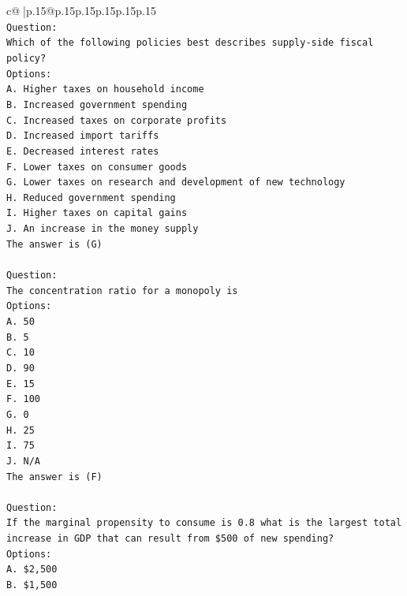 \documentclass{article}
\begin{document}
{\begin{supertabular}{c@{$\;$}|p{.15\linewidth}@{}p{.15\linewidth}p{.15\linewidth}p{.15\linewidth}p{.15\linewidth}p{.15\linewidth}}
{{{\\ 
\texttt{Question:} \\
\texttt{Which of the following policies best describes supply{-}side fiscal policy?} \\
\texttt{Options:} \\
\texttt{A. Higher taxes on household income} \\
\texttt{B. Increased government spending} \\
\texttt{C. Increased taxes on corporate profits} \\
\texttt{D. Increased import tariffs} \\
\texttt{E. Decreased interest rates} \\
\texttt{F. Lower taxes on consumer goods} \\
\texttt{G. Lower taxes on research and development of new technology} \\
\texttt{H. Reduced government spending} \\
\texttt{I. Higher taxes on capital gains} \\
\texttt{J. An increase in the money supply} \\
\texttt{The answer is (G)} \\
\\ 
\texttt{Question:} \\
\texttt{The concentration ratio for a monopoly is} \\
\texttt{Options:} \\
\texttt{A. 50} \\
\texttt{B. 5} \\
\texttt{C. 10} \\
\texttt{D. 90} \\
\texttt{E. 15} \\
\texttt{F. 100} \\
\texttt{G. 0} \\
\texttt{H. 25} \\
\texttt{I. 75} \\
\texttt{J. N/A} \\
\texttt{The answer is (F)} \\
\\ 
\texttt{Question:} \\
\texttt{If the marginal propensity to consume is 0.8 what is the largest total increase in GDP that can result from \$500 of new spending?} \\
\texttt{Options:} \\
\texttt{A. \$2,500 } \\
\texttt{B. \$1,500} \\
}}}
\end{supertabular}}
\end{document}
